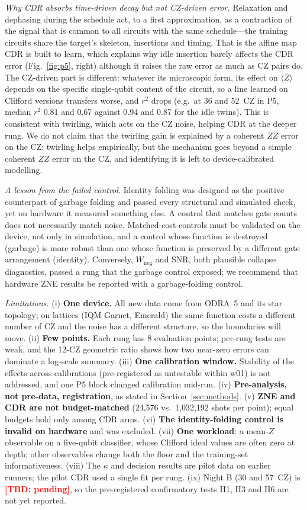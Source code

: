 \documentclass[conference]{IEEEtran}
\newcommand{\TBD}[1]{\textcolor{red}{\textbf{[TBD: #1]}}}
\newcommand{\ev}[1]{\langle #1\rangle}
\begin{document}
\emph{Why CDR absorbs time-driven decay but not CZ-driven error.} Relaxation and dephasing during
the schedule act, to a first approximation, as a contraction of the signal that is common to all
circuits with the same schedule---the training circuits share the target's skeleton, insertions
and timing. That is the affine map CDR is built to learn, which explains why idle insertion
barely affects the CDR error (Fig.~\ref{fig:p5}, right) although it raises the raw error as much
as CZ pairs do. The CZ-driven part is different: whatever its microscopic form, its effect on
$\ev{\bar Z}$ depends on the specific single-qubit content of the circuit, so a line learned on
Clifford versions transfers worse, and $r^2$ drops (e.g.\ at 36 and 52~CZ in P5, median $r^2$
0.81 and 0.67 against 0.94 and 0.87 for the idle twins). This is consistent with twirling, which
acts on the CZ noise, helping CDR at the deeper rung. We do not claim that the twirling gain is
explained by a coherent $ZZ$ error on the CZ: twirling helps empirically, but the mechanism goes
beyond a simple coherent $ZZ$ error on the CZ, and identifying it is left to device-calibrated
modelling.

\emph{A lesson from the failed control.} Identity folding was designed as the positive
counterpart of garbage folding and passed every structural and simulated check, yet on hardware
it measured something else. A control that matches gate counts does not necessarily match
noise. Matched-cost controls must be validated on the device, not only in simulation, and a
control whose function is destroyed (garbage) is more robust than one whose function is preserved
by a different gate arrangement (identity). Conversely, $W_{\text{neg}}$ and SNR, both
plausible collapse diagnostics, passed a rung that the garbage control exposed; we recommend
that hardware ZNE results be reported with a garbage-folding control.

\emph{Limitations.} (i) \textbf{One device.} All new data come from ODRA~5 and its star topology;
on lattices (IQM Garnet, Emerald) the same function costs a different number of CZ and the noise
has a different structure, so the boundaries will move. (ii) \textbf{Few points.} Each rung has 8
evaluation points; per-rung tests are weak, and the 12-CZ geometric ratio shows how two
near-zero errors can dominate a log-scale summary. (iii) \textbf{One calibration window.} Stability
of the effects across calibrations (pre-registered as untestable within w01) is not addressed,
and one P5 block changed calibration mid-run. (iv) \textbf{Pre-analysis, not pre-data,
registration}, as stated in Section~\ref{sec:methods}. (v) \textbf{ZNE and CDR are not budget-matched}
(24,576 vs.\ 1,032,192 shots per point); equal budgets hold only among CDR arms. (vi) \textbf{The
identity-folding control is invalid on hardware} and was excluded. (vii) \textbf{One workload}:
a mean-$Z$ observable on a five-qubit classifier, whose Clifford ideal values are often zero at
depth; other observables change both the floor and the training-set informativeness. (viii) The
$\kappa$ and decision results are pilot data on earlier runners; the pilot CDR used a single fit
per rung. (ix) Night B (30 and 57~CZ) is \TBD{pending}, so the pre-registered confirmatory
tests H1, H3 and H6 are not yet reported.
\end{document}

